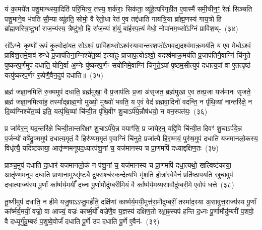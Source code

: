 यं का॒मये॑त पशु॒मान्थ्स्या॒दिति॑ परि॒मित्य॒ तस्य॒ शर्क॑राः॒ सिक॑ता॒ व्यू॑हे॒त्परि॑गृहीत ए॒वास्मै॑ समी॒चीन॒ꣳ॒ रेतः॑ सिञ्चति पशु॒माने॒व भ॑वति सौ॒म्या व्यू॑हति॒ सोमो॒ वै रे॑तो॒धा रेत॑ ए॒व तद्द॑धाति गायत्रि॒या ब्रा᳚ह्म॒णस्य॑ गाय॒त्रो हि ब्रा᳚ह्म॒णस्त्रि॒ष्टुभा॑ राज॒न्य॑स्य॒ त्रैष्टु॑भो॒ हि रा॑ज॒न्यः॑ शं॒युं बा॑र्\mbox{}हस्प॒त्यं मेधो॒ नोपा॑नम॒थ्सो᳚\-ऽग्निं प्रावि॑श॒थ्-~(३४)\ip

सो᳚\-ऽग्नेः कृष्णो॑ रू॒पं कृ॒त्वोदा॑यत॒ सो\-ऽश्वं॒ प्रावि॑श॒थ्सो\-ऽश्व॑स्यावान्तरश॒फो॑\-ऽभव॒द्यदश्व॑माक्र॒मय॑ति॒ य ए॒व मेधो\-ऽश्वं॒ प्रावि॑श॒त्तमे॒वाव॑ रुन्धे प्र॒जा\-प॑तिना॒ग्निश्चे॑त॒व्य॑ इत्या॑हुः प्राजाप॒त्यो\-ऽश्वो॒ यदश्व॑माक्र॒मय॑ति प्र॒जा\-प॑तिनै॒वाग्निं चि॑नुते पुष्करप॒र्णमुप॑ दधाति॒ योनि॒र्वा अ॒ग्नेः पु॑ष्करप॒र्णꣳ सयो॑निमे॒वाग्निं चि॑नुते॒\-ऽपां पृ॒ष्ठम॒सीत्युप॑ दधात्य॒पां वा ए॒तत्पृ॒ष्ठं यत्पु॑ष्करप॒र्णꣳ रू॒पेणै॒वैन॒दुप॑ दधाति॥~(३५)\ip

{\anuvakamend[{इन्द्रः॑ प॒शुका॑मस्य भवत्यविश॒थ्सयो॑निं विꣳश॒तिश्च॑}]}

ब्रह्म॑ जज्ञा॒नमिति॑ रु॒क्ममुप॑ दधाति॒ ब्रह्म॑मुखा॒ वै प्र॒जा\-प॑तिः प्र॒जा अ॑सृजत॒ ब्रह्म॑मुखा ए॒व तत्प्र॒जा यज॑मानः सृजते॒ ब्रह्म॑ जज्ञा॒नमित्या॑ह॒ तस्मा᳚द्\-ब्राह्म॒णो मुख्यो॒ मुख्यो॑ भवति॒ य ए॒वं वेद॑ ब्रह्मवा॒दिनो॑ वदन्ति॒ न पृ॑थि॒व्यां नान्तरि॑क्षे॒ न दि॒व्य॑ग्निश्चे॑त॒व्य॑ इति॒ यत्पृ॑थि॒व्यां चि॑न्वी॒त पृ॑थि॒वीꣳ शु॒चा\-ऽर्प॑ये॒न्नौष॑धयो॒ न वन॒स्पत॑यः॒~(३६)\ip

प्र जा॑येर॒न्॒ यद॒न्तरि॑क्षे चिन्वी॒तान्तरि॑क्षꣳ शु॒चा\-ऽर्प॑ये॒न्न वयाꣳ॑सि॒ प्र जा॑येर॒न्॒ यद्दि॒वि चि॑न्वी॒त दिवꣳ॑ शु॒चा\-ऽर्प॑ये॒न्न प॒र्जन्यो॑ वर्\mbox{}षेद्रु॒क्ममुप॑ दधात्य॒मृतं॒ वै हिर॑ण्यम॒मृत॑ ए॒वाग्निं चि॑नुते॒ प्रजा᳚त्यै हिर॒ण्मयं॒ पुरु॑ष॒मुप॑ दधाति यजमानलो॒कस्य॒ विधृ॑त्यै॒ यदिष्ट॑काया॒ आतृ॑ण्णमनूपद॒ध्यात्प॑शू॒नां च॒ यज॑मानस्य च प्रा॒णमपि॑ दध्याद्दक्षिण॒तः~(३७)\ip

प्राञ्च॒मुप॑ दधाति दा॒धार॑ यजमानलो॒कं न प॑शू॒नां च॒ यज॑मानस्य च प्रा॒णमपि॑ दधा॒त्यथो॒ खल्विष्ट॑काया॒ आतृ॑ण्ण॒मनूप॑ दधाति प्रा॒णाना॒मुथ्सृ॑ष्ट्यै द्र॒फ्सश्च॑स्क॒न्देत्य॒भि मृ॑शति॒ होत्रा᳚स्वे॒वैनं॒ प्रति॑\-ष्ठापयति॒ स्रुचा॒वुप॑ दधा॒त्याज्य॑स्य पू॒र्णां का᳚र्ष्मर्य॒मयीं᳚ द॒ध्नः पू॒र्णामौदु॑म्बरीमि॒यं वै का᳚र्ष्मर्य॒मय्य॒सावौदु॑म्बरी॒मे ए॒वोप॑ धत्ते~(३८)\ip

तू॒ष्णीमुप॑ दधाति॒ न हीमे यजु॒षाऽऽप्तु॒मर्\mbox{}ह॑ति॒ दक्षि॑णां कार्ष्मर्य॒मयी॒मुत्त॑रा॒मौदु॑म्बरीं॒ तस्मा॑द॒स्या अ॒सावुत्त॒राज्य॑स्य पू॒र्णां का᳚र्ष्मर्य॒मयीं॒ वज्रो॒ वा आज्यं॒ वज्रः॑ कार्ष्म॒र्यो॑ वज्रे॑णै॒व य॒ज्ञस्य॑ दक्षिण॒तो रक्षा॒ꣴ॒स्यप॑ हन्ति द॒ध्नः पू॒र्णामौदु॑म्बरीं प॒शवो॒ वै दध्यूर्गु॑दु॒म्बरः॑ प॒शुष्वे॒वोर्जं॑ दधाति पू॒र्णे उप॑ दधाति पू॒र्णे ए॒वैन॑-~(३९)\ip

